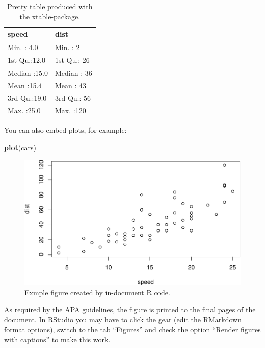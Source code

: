 \documentclass[american,man]{apa6}
\newenvironment{Shaded}{\begin{snugshade}}{\end{snugshade}}
\newcommand{\KeywordTok}[1]{\textcolor[rgb]{0.13,0.29,0.53}{\textbf{{#1}}}}
\newcommand{\NormalTok}[1]{{#1}}
\begin{document}
\begin{table}[ht]
\centering
\caption{Pretty table produced with the xtable-package.} 
\begin{tabular}{ll}
  \toprule
    speed &      dist \\ 
  \midrule
Min.   : 4.0   & Min.   :  2   \\ 
  1st Qu.:12.0   & 1st Qu.: 26   \\ 
  Median :15.0   & Median : 36   \\ 
  Mean   :15.4   & Mean   : 43   \\ 
  3rd Qu.:19.0   & 3rd Qu.: 56   \\ 
  Max.   :25.0   & Max.   :120   \\ 
   \bottomrule
\end{tabular}
\end{table}

You can also embed plots, for example:

\begin{Shaded}
\begin{Highlighting}[]
\KeywordTok{plot}\NormalTok{(cars)}
\end{Highlighting}
\end{Shaded}

\begin{figure}[htbp]
\centering
\includegraphics{./example_files/figure-latex/unnamed-chunk-3.pdf}
\caption{Exmple figure created by in-document R code.}
\end{figure}

As required by the APA guidelines, the figure is printed to the final
pages of the document. In RStudio you may have to click the gear (edit
the RMarkdown format options), switch to the tab \enquote{Figures} and
check the option \enquote{Render figures with captions} to make this
work.
\end{document}
